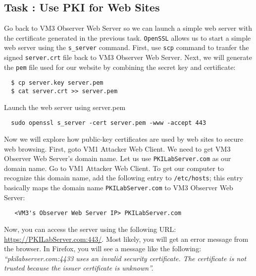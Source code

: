\documentclass{article}
\begin{document}


\subsection{Task \mytask: Use PKI for Web Sites}
Go back to VM3 Observer Web Server so we can launch a simple web server with the certificate 
generated in the previous task. {\tt OpenSSL} allows us 
to start a simple web server using the {\tt s\_server} command. First, use {\tt scp} command to tranfer the signed {\tt server.crt} file back to VM3 Observer Web Server. Next, we will generate the {\tt pem} file used for our website by combining the secret key and certificate:

\begin{verbatim} 
  $ cp server.key server.pem
  $ cat server.crt >> server.pem
\end{verbatim}
Launch the web server using server.pem
\begin{verbatim}
  sudo openssl s_server -cert server.pem -www -accept 443
\end{verbatim} 

Now we will explore how public-key certificates 
are used by web sites to secure web browsing. First, goto VM1 Attacker Web Client. We need to get VM3 Observer Web Server's domain name. Let us use {\tt PKILabServer.com} as 
our domain name. Go to VM1 Attacker Web Client. To get our computer to recognize this domain name,
add the following entry to {\tt /etc/hosts}; this entry
basically maps the domain name {\tt PKILabServer.com} to 
VM3 Observer Web Server:
\begin{verbatim}
   <VM3's Observer Web Server IP> PKILabServer.com
\end{verbatim} 


Now, you can access the server using the following
URL: \url{https://PKILabServer.com:443/}.
Most likely, you will get an error message from the browser. In Firefox, you will
see a message like the following:
{\em ``pkilabserver.com:4433 uses an invalid security certificate.
The certificate is not trusted because the issuer certificate is unknown''.}
\end{document}

